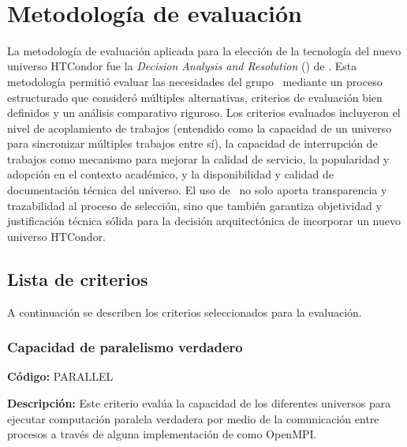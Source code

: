 \label{cap:dar}
\mbox{}\\


\section{Metodología de evaluación}

La metodología de evaluación aplicada para la elección de la tecnología del nuevo universo HTCondor fue la \textit{Decision Analysis and Resolution} (\DAR) de \CMMI \citep{CMMIInstitute2010}. Esta metodología permitió evaluar las necesidades del grupo \GRID\ mediante un proceso estructurado que consideró múltiples alternativas, criterios de evaluación bien definidos y un análisis comparativo riguroso. Los criterios evaluados incluyeron el nivel de acoplamiento de trabajos (entendido como la capacidad de un universo para sincronizar múltiples trabajos entre sí), la capacidad de interrupción de trabajos como mecanismo para mejorar la calidad de servicio, la popularidad y adopción en el contexto académico, y la disponibilidad y calidad de documentación técnica del universo. El uso de \DAR\ no solo aporta transparencia y trazabilidad al proceso de selección, sino que también garantiza objetividad y justificación técnica sólida para la decisión arquitectónica de incorporar un nuevo universo HTCondor.

\subsection{Lista de criterios}
A continuación se describen los criterios seleccionados para la evaluación.

\subsubsection{Capacidad de paralelismo verdadero}
\textbf{Código:} PARALLEL

\textbf{Descripción:} Este criterio evalúa la capacidad de los diferentes universos para ejecutar computación paralela verdadera \citep{Morgan2009} por medio de la comunicación entre procesos a través de alguna implementación de \MPI como OpenMPI.

